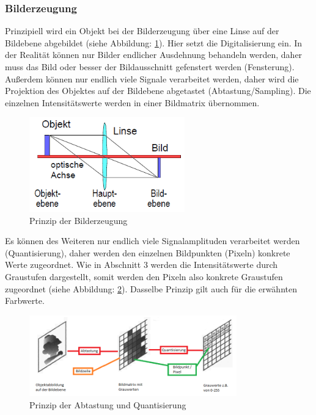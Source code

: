 \subsubsection{Bilderzeugung}
Prinzipiell wird ein Objekt bei der Bilderzeugung über eine Linse auf der Bildebene abgebildet (siehe Abbildung: \ref{fig:bilderzeugung_steph}). Hier setzt die Digitalisierung ein. In der Realität können nur Bilder endlicher Ausdehnung behandeln werden, daher muss das Bild oder besser der Bildausschnitt gefenstert werden (Fensterung). Außerdem können nur endlich viele Signale verarbeitet werden, daher wird die Projektion des Objektes auf der Bildebene abgetastet (Abtastung/Sampling). Die einzelnen Intensitätswerte werden in einer Bildmatrix übernommen.

\begin{figure}[h]
	\centering
		\includegraphics[width=0.6\textwidth]{img/prinzip_bilderzeugung.png}
	\caption[Prinzip der Bilderzeugung]{Prinzip der Bilderzeugung}
	\label{fig:bilderzeugung_steph}
\end{figure}

Es können des Weiteren nur endlich viele Signalamplituden verarbeitet werden (Quantisierung), daher werden den einzelnen Bildpunkten (Pixeln) konkrete Werte zugeordnet. Wie in Abschnitt 3 werden die Intensitätswerte durch Graustufen dargestellt, somit werden den Pixeln also konkrete Graustufen zugeordnet (siehe Abbildung: \ref{fig:abtastung_steph}). Dasselbe Prinzip gilt auch für die erwähnten Farbwerte.

\begin{figure}[h]
	\centering
		\includegraphics[width=0.8\textwidth]{img/prinzip_abtastung.png}
	\caption[Prinzip der Abtastung und Quantisierung]{Prinzip der Abtastung und Quantisierung}
	\label{fig:abtastung_steph}
\end{figure}


